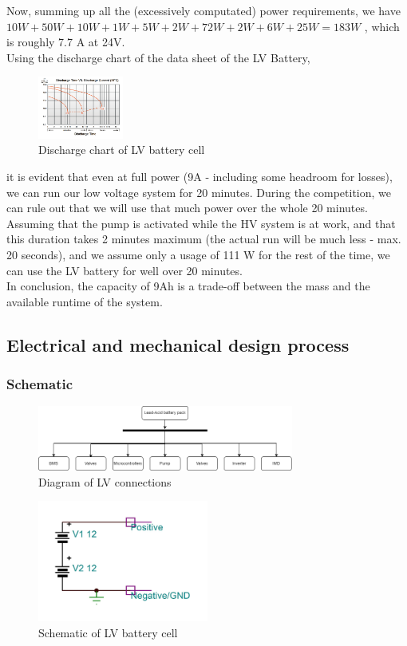 Now, summing up all the (excessively computated) power requirements, we have
\(10W + 50W + 10W + 1W + 5W + 2W + 72W + 2W + 6W + 25W = 183W \) , which is roughly 7.7 A at 24V. \\
Using the discharge chart of the data sheet of the LV Battery,
\begin{figure}
    \centering
    \includegraphics[width=0.25\textwidth]{texfiles/elec/eimg/LV_Battery_WP1236W}
    \caption{Discharge chart of LV battery cell}
\end{figure}
it is evident that even at full power (9A - including some headroom for losses), we can run our low voltage system for 20 minutes. During the competition, we can rule out that we will use that much power over the whole 20 minutes. 
Assuming that the pump is activated while the HV system is at work, and that this duration takes 2 minutes maximum (the actual run will be much less - max. 20 seconds), and we assume only a usage of 111 W for the rest of the time,
we can use the LV battery for well over 20 minutes. \\
In conclusion, the capacity of 9Ah is a trade-off between the mass and the available runtime of the system.
\subsection{Electrical and mechanical design process}
\subsubsection{Schematic}
\begin{figure}[h]
    \centering
    \includegraphics[width=0.75\textwidth]{texfiles/elec/eimg/LV_Diagram}
    \caption{Diagram of LV connections}
\end{figure}
\begin{figure}[h]
    \centering
    \includegraphics[width=0.5\textwidth]{texfiles/elec/eimg/LVCircuit}
    \caption{Schematic of LV battery cell}
\end{figure}
